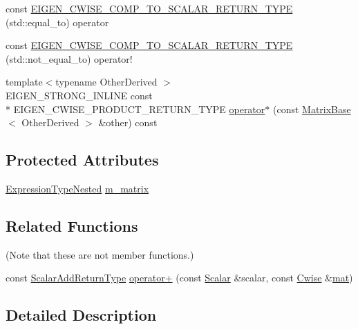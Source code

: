 \begin{DoxyCompactItemize}
\item 
const \hyperlink{class_cwise_ab3fdfc03388e878cc748a1b352dba824}{E\-I\-G\-E\-N\-\_\-\-C\-W\-I\-S\-E\-\_\-\-C\-O\-M\-P\-\_\-\-T\-O\-\_\-\-S\-C\-A\-L\-A\-R\-\_\-\-R\-E\-T\-U\-R\-N\-\_\-\-T\-Y\-P\-E} (std\-::equal\-\_\-to) operator
\item 
const \hyperlink{class_cwise_aa9447ad2e8a1f781e31524cda95f63f1}{E\-I\-G\-E\-N\-\_\-\-C\-W\-I\-S\-E\-\_\-\-C\-O\-M\-P\-\_\-\-T\-O\-\_\-\-S\-C\-A\-L\-A\-R\-\_\-\-R\-E\-T\-U\-R\-N\-\_\-\-T\-Y\-P\-E} (std\-::not\-\_\-equal\-\_\-to) operator!
\item 
{\footnotesize template$<$typename Other\-Derived $>$ }\\E\-I\-G\-E\-N\-\_\-\-S\-T\-R\-O\-N\-G\-\_\-\-I\-N\-L\-I\-N\-E const \\*
E\-I\-G\-E\-N\-\_\-\-C\-W\-I\-S\-E\-\_\-\-P\-R\-O\-D\-U\-C\-T\-\_\-\-R\-E\-T\-U\-R\-N\-\_\-\-T\-Y\-P\-E \hyperlink{class_cwise_a898c6e88f2ed807a1610241a2e95fb2b}{operator$\ast$} (const \hyperlink{class_matrix_base}{Matrix\-Base}$<$ Other\-Derived $>$ \&other) const 
\end{DoxyCompactItemize}
\subsection*{Protected Attributes}
\begin{DoxyCompactItemize}
\item 
\hyperlink{class_cwise_a0eb3cc18a0d32ab3966ab0add4316e2e}{Expression\-Type\-Nested} \hyperlink{class_cwise_abc5b950c8664c38bd0960a8189a68817}{m\-\_\-matrix}
\end{DoxyCompactItemize}
\subsection*{Related Functions}
(Note that these are not member functions.) \begin{DoxyCompactItemize}
\item 
const \hyperlink{class_cwise_a89225bb17b5d6bfc9e4834590f38d61f}{Scalar\-Add\-Return\-Type} \hyperlink{class_cwise_ae3ebfb798683c224a3b4f25a4a35073d}{operator+} (const \hyperlink{class_cwise_aaa88a1b7a680bc160011b24e948bcaaf}{Scalar} \&scalar, const \hyperlink{class_cwise}{Cwise} \&\hyperlink{uavobjecttemplate_8m_a16a51e808b16c46bbfd36da2e37cd123}{mat})
\end{DoxyCompactItemize}


\subsection{Detailed Description}
